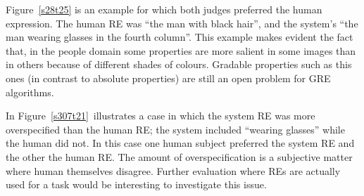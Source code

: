 Figure~\ref{s28t25} is an example for which both judges preferred the human expression. The human  RE was ``the man with black hair'', and the system's ``the man wearing glasses in the fourth column''. This example makes evident the fact that, in the people domain some properties are more salient in some images than in others because of different shades of colours. Gradable properties such as this ones (in contrast to absolute properties) are still an open problem for GRE algorithms. 

In Figure~\ref{s307t21}~illustrates a case in which the system RE was more overspecified than the human RE; the system included ``wearing glasses'' while the human did not. In this case one human subject preferred the system RE and the other the human RE. The amount of overspecification is a subjective matter where human themselves disagree. Further evaluation where REs are actually used for a task would be interesting to investigate this issue.  


